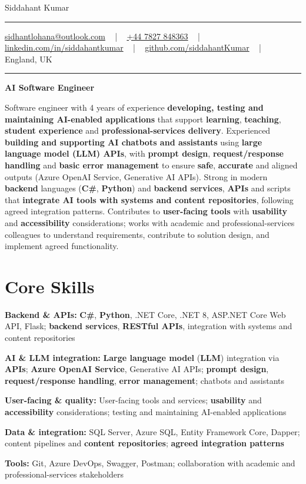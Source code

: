 \documentclass[letterpaper,10pt]{article}
\newcommand{\documentTitle}[2]{
  \begin{center}
    \vspace*{-0.3in}
    {\Huge\color{accentTitle} #1}
    \vspace{8pt}
    {\color{accentLine} \hrule}
    \vspace{2pt}
    \footnotesize{#2}
    \vspace{2pt}
    {\color{accentLine} \hrule}
  \end{center}
}
\newenvironment{resume_list}{
  \vspace{-7pt}
  \begin{itemize}[itemsep=-2px, parsep=1pt, leftmargin=30pt]
}{
  \end{itemize}
}
\begin{document}
\documentTitle{Siddahant Kumar}{
\vspace{0.1cm}
\href{mailto:sidhantlohana@outlook.com}{sidhantlohana@outlook.com} ~ | ~
\href{tel:+447827848363}{+44 7827 848363} ~ | ~
\href{https://www.linkedin.com/in/siddahantkumar/}{linkedin.com/in/siddahantkumar} ~ | ~
\href{https://github.com/siddahantKumar}{github.com/siddahantKumar} ~ | ~
England, UK
}

\begin{center}
\textbf{AI Software Engineer}
\end{center}

Software engineer with 4 years of experience \textbf{developing, testing and maintaining AI-enabled applications} that support \textbf{learning}, \textbf{teaching}, \textbf{student experience} and \textbf{professional-services delivery}. Experienced \textbf{building and supporting AI chatbots and assistants} using \textbf{large language model (LLM) APIs}, with \textbf{prompt design}, \textbf{request/response handling} and \textbf{basic error management} to ensure \textbf{safe}, \textbf{accurate} and aligned outputs (Azure OpenAI Service, Generative AI APIs). Strong in modern \textbf{backend} languages (\textbf{C\#}, \textbf{Python}) and \textbf{backend services}, \textbf{APIs} and scripts that \textbf{integrate AI tools with systems and content repositories}, following agreed integration patterns. Contributes to \textbf{user-facing tools} with \textbf{usability} and \textbf{accessibility} considerations; works with academic and professional-services colleagues to understand requirements, contribute to solution design, and implement agreed functionality.


\section{Core Skills}

\begin{resume_list}
    \item \textbf{Backend \& APIs:} \textbf{C\#}, \textbf{Python}, .NET Core, .NET 8, ASP.NET Core Web API, Flask; \textbf{backend services}, \textbf{RESTful APIs}, integration with systems and content repositories
    \item \textbf{AI \& LLM integration:} \textbf{Large language model} (\textbf{LLM}) integration via \textbf{APIs}; \textbf{Azure OpenAI Service}, Generative AI APIs; \textbf{prompt design}, \textbf{request/response handling}, \textbf{error management}; chatbots and assistants
    \item \textbf{User-facing \& quality:} User-facing tools and services; \textbf{usability} and \textbf{accessibility} considerations; testing and maintaining AI-enabled applications
    \item \textbf{Data \& integration:} SQL Server, Azure SQL, Entity Framework Core, Dapper; content pipelines and \textbf{content repositories}; \textbf{agreed integration patterns}
    \item \textbf{Tools:} Git, Azure DevOps, Swagger, Postman; collaboration with academic and professional-services stakeholders
\end{resume_list}
\end{document}
